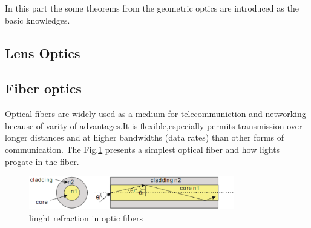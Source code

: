 In this part the  some theorems from the geometric optics  are introduced as the basic knowledges.

\subsection{Lens Optics}


\subsection{Fiber optics}
Optical fibers are widely used as a medium for telecommuniction and networking because of varity of advantages.It is flexible,especially permits transmission over longer distances and at higher bandwidths (data rates) than other forms of communication. The Fig.\ref{fig:opticfiber} presents a simplest optical fiber and how lights progate in the fiber. 

\begin{figure}[httbp]
\centering
\includegraphics[width=0.8\textwidth]{bilder/opticfiber}
\caption{linght refraction in optic fibers}
\label{fig:opticfiber}
\end{figure}

